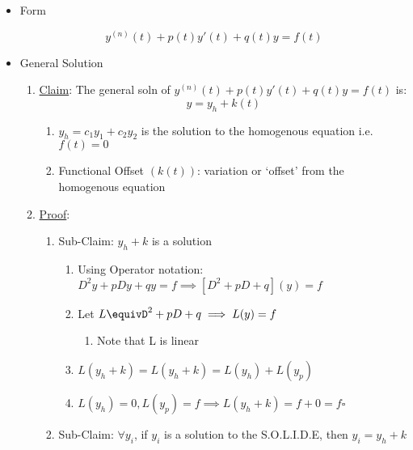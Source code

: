 \documentclass[11pt]{article}
\begin{document}
\begin{itemize}

\item Form\\
\label{sec-9.2.5.1}

     \begin{equation}
     y^{(n)}(t)+p(t)y'(t)+q(t)y=f(t)
     \end{equation}

\item General Solution\\
\label{sec-9.2.5.2}

\begin{enumerate}
\item \underline{Claim}: The general soln of $y^{(n)}(t)+p(t)y'(t)+q(t)y=f(t)$ is:
         \begin{equation}
         y=y_h+k(t)
         \end{equation}

\begin{enumerate}
\item $y_h = c_1y_1+c_2y_2$ is the solution to the homogenous
            equation i.e. $f(t)=0$
\item Functional Offset $(k(t))$: variation or `offset' from the homogenous equation
\end{enumerate}

\item \underline{Proof}:

\begin{enumerate}
\item Sub-Claim: $y_h+k$ is a solution

\begin{enumerate}
\item Using Operator notation: $D^2y+pDy+qy=f \implies [D^2+pD+q](y)=f$
\item Let $L\equivD^2+pD+q \implies L(y)=f$

\begin{enumerate}
\item Note that L is linear
\end{enumerate}

\item $L(y_h+k) = L(y_h+k)=L(y_h)+L(y_p)$
\item $L(y_h)=0,L(y_p)=f \implies L(y_h+k)=f+0 = f \square$
\end{enumerate}

\item Sub-Claim: $\forall y_i$, if $y_i$ is a solution to the
            S.O.L.I.D.E, then $y_i=y_h+k$


\end{enumerate}
\end{enumerate}
\end{itemize}
\end{document}
